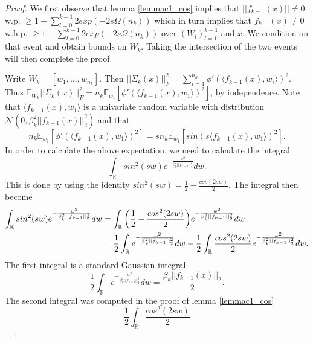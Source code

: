 \documentclass{article}
\theoremstyle{plain}
\theoremstyle{definition}
\theoremstyle{remark}
\newcommand\R{\mathbb{R}}
\begin{document}
\begin{proof}
We first observe that lemma \ref{lemmac1_cos} implies that 
$\vert\vert f_{k-1}(x)\vert\vert \neq 0$ w.p. $\geq 1 - \sum_{l=0}^{k-1}2exp(-2s\Omega(n_k))$
which in turn implies that 
$f_{k-}(x) \neq 0$ w.h.p. $\geq 1 - \sum_{l=0}^{k-1}2exp(-2s\Omega(n_k))$ over
$(W_l)_{l=1}^{k-1}$ and $x$. We condition on that event and obtain bounds on 
$W_k$. Taking the intersection of the two events will then complete the proof.

Write $W_k = [w_1,\ldots ,w_{n_{k}}]$. Then 
$\vert\vert\Sigma_k(x)\vert\vert_F^2 =
\sum_{i=1}^{n_k}\phi'(\langle f_{k-1}(x), w_i\rangle)^2$. Thus 
$\mathbb{E}_{W_k}\vert\vert\Sigma_k(x)\vert\vert_F^2 = 
n_k\mathbb{E}_{w_1}[\phi'(\langle f_{k-1}(x), w_1\rangle)^2]$, by independence.
Note that $\langle f_{k-1}(x), w_1\rangle$ is a univariate random variable with
distribution $\mathcal{N}(0, \beta_k^2\vert\vert f_{k-1}(x)\vert\vert_2^2)$ and that 
\begin{equation*}
n_k\mathbb{E}_{w_1}[\phi'(\langle f_{k-1}(x), w_1\rangle)^2] = 
sn_k\mathbb{E}_{w_1}[sin(s\langle f_{k-1}(x), w_1\rangle)^2].
\end{equation*}
In order to calculate the above expectation, we need to calculate the integral
\begin{equation*}
\int_{\R}sin^2(sw)e^{-\frac{w^2}{\beta_k^2\vert\vert f_{k-1}\vert\vert_2^2}}dw.
\end{equation*}
This is done by using the identity $sin^2(sw) = 
\frac{1}{2} - \frac{cos(2sw)}{2}$. The integral then become
\begin{align*}
\int_{\R}sin^2(sw)e^{-\frac{w^2}{\beta_k^2\vert\vert f_{k-1}\vert\vert_2^2}}dw 
&= \int_{\R}\bigg{(}\frac{1}{2} - \frac{cos^2(2sw)}{2} \bigg{)}
e^{-\frac{w^2}{\beta_k^2\vert\vert f_{k-1}\vert\vert_2^2}}dw \\
&=
\frac{1}{2}\int_{\R}e^{-\frac{w^2}{\beta_k^2\vert\vert f_{k-1}\vert\vert_2^2}}dw -
\frac{1}{2}\int_{\R}\frac{cos^2(2sw)}{2}
e^{-\frac{w^2}{\beta_k^2\vert\vert f_{k-1}\vert\vert_2^2}}dw.
\end{align*}
The first integral is a standard Gaussian integral
\begin{equation*}
\frac{1}{2}\int_{\R}e^{-\frac{w^2}{\beta_k^2\vert\vert f_{k-1}\vert\vert_2^2}}dw
=
\frac{\beta_k\vert\vert f_{k-1}(x)\vert\vert_2}{2}.
\end{equation*}
The second integral was computed in the proof of lemma \ref{lemmac1_cos}
\begin{equation*}
\frac{1}{2}\int_{\R}\frac{cos^2(2sw)}{2}

\end{equation*}
\end{proof}
\end{document}
